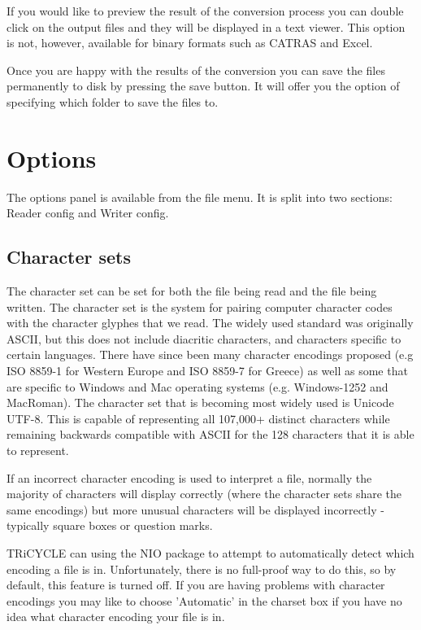 \documentclass[10pt, headsepline,DIV14,BCOR0.5cm]{scrreprt}
\begin{document}
If you would like to preview the result of the conversion process you can double click on the output files
and they will be displayed in a text viewer. This option is not, however, available for binary formats such
as CATRAS and Excel.

Once you are happy with the results of the conversion you can save the files permanently to disk by pressing
the save button. It will offer you the option of specifying which folder to save the files to.


\chapter{Options}

The options panel is available from the file menu. It is split into two sections: Reader config and Writer
config.

\section{Character sets}

The character set can be set for both the file being read and the file being written. The character set is
the system for pairing computer character codes with the character glyphes that we read. The widely
used standard was originally ASCII, but this does not include diacritic characters, and characters specific
to certain languages. There have since been many character encodings proposed (e.g ISO 8859-1 for
Western Europe and ISO 8859-7 for Greece) as well as some that are specific to Windows and Mac
operating systems (e.g. Windows-1252 and MacRoman). The character set that is becoming most widely
used is Unicode UTF-8. This is capable of representing all 107,000+ distinct characters while remaining
backwards compatible with ASCII for the 128 characters that it is able to represent.

If an incorrect character encoding is used to interpret a file, normally the majority of characters will display
correctly (where the character sets share the same encodings) but more unusual characters will be displayed
incorrectly - typically square boxes or question marks.

TRiCYCLE can using the NIO package to attempt to automatically detect which encoding a file is in.
Unfortunately, there is no full-proof way to do this, so by default, this feature is turned off. If you are
having problems with character encodings you may like to choose 'Automatic' in the charset box if you
have no idea what character encoding your file is in.
\end{document}
